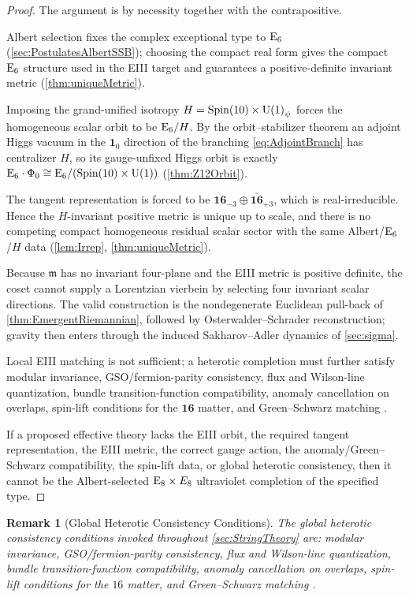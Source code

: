 \documentclass[pdflatex,sn-mathphys-num]{sn-jnl}
\theoremstyle{thmstyleone}
\theoremstyle{thmstylethree}%
\theoremstyle{thmstyletwo}%
\newtheorem{remark}[remark]{Remark}
\begin{document}
\begin{proof}
The argument is by necessity together with the contrapositive.

Albert selection fixes the complex exceptional type
to $\mathrm{E}_{6}$ (\autoref{sec:PostulatesAlbertSSB}); choosing the compact real form gives the
compact $\mathrm{E}_{6}$ structure used in the EIII target and guarantees a
positive-definite invariant metric (\autoref{thm:uniqueMetric}).

Imposing the grand-unified isotropy $H=\operatorname{Spin}(10) \times \mathrm{U(1)}_\psi$ forces the homogeneous
scalar orbit to be $\mathrm{E}_{6}/H$. By the orbit--stabilizer theorem an adjoint Higgs
vacuum in the $\mathbf{1}_{0}$ direction of the branching \eqref{eq:AdjointBranch}
has centralizer $H$, so its gauge-unfixed Higgs orbit is exactly
$\mathrm{E}_{6}\cdot\Phi_{0}\cong\mathrm{E}_{6}/(\operatorname{Spin}(10) \times \mathrm{U(1)})$
(\autoref{thm:Z12Orbit}).

The tangent representation is forced to be
$\mathbf{16}_{-3}\oplus\overline{\mathbf{16}}_{+3}$, which is real-irreducible. Hence the
$H$-invariant positive metric is unique up to scale, and there is no competing
compact homogeneous residual scalar sector with the same Albert/$\mathrm{E}_{6}$/$H$
data (\autoref{lem:Irrep}, \autoref{thm:uniqueMetric}).

Because $\mathfrak m$ has no invariant four-plane and the EIII metric is positive
definite, the coset cannot supply a Lorentzian vierbein by selecting four invariant
scalar directions. The valid construction is the nondegenerate Euclidean pull-back of
\autoref{thm:EmergentRiemannian}, followed by Osterwalder--Schrader
reconstruction; gravity then enters through the induced Sakharov--Adler
dynamics of \autoref{sec:sigma}.

Local EIII matching is not sufficient; a heterotic
completion must further satisfy modular invariance, GSO/fermion-parity
consistency, flux and Wilson-line quantization, bundle transition-function
compatibility, anomaly cancellation on overlaps, spin-lift conditions for the
$\mathbf{16}$ matter, and Green--Schwarz matching \cite{GreenSchwarz:1984}.

If a proposed effective theory lacks the EIII orbit, the required tangent
representation, the EIII metric, the correct gauge action, the
anomaly/Green--Schwarz compatibility, the spin-lift data, or global heterotic
consistency, then it cannot be the Albert-selected $\mathrm{E}_{8}\times E_{8}$
ultraviolet completion of the specified type.
\end{proof}

\begin{remark}[Global Heterotic Consistency Conditions]
\label{rmk:Ledger}
The global heterotic consistency conditions invoked throughout
\autoref{sec:StringTheory} are:
modular invariance, GSO/fermion-parity consistency, flux and Wilson-line
quantization, bundle transition-function compatibility, anomaly cancellation
on overlaps, spin-lift conditions for the $16$ matter, and Green--Schwarz
matching \cite{GreenSchwarz:1984}.
\end{remark}
\end{document}
